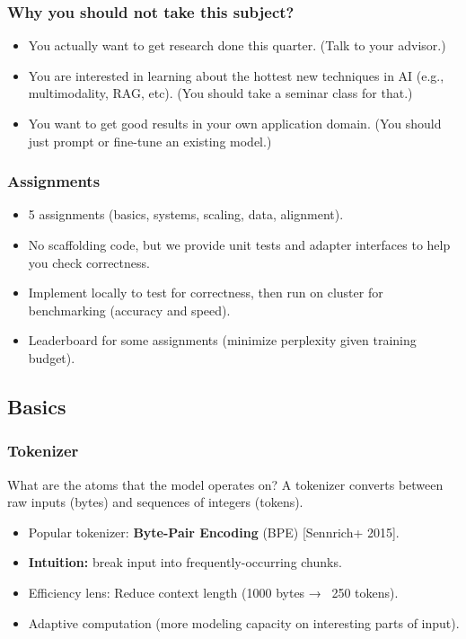 \documentclass[12pt,twoside]{article}
\begin{document}
\subsubsection*{Why you should not take this subject?}

\begin{itemize}
    \item You actually want to get research done this quarter. (Talk to your advisor.)
    \item You are interested in learning about the hottest new techniques in AI (e.g., multimodality, RAG, etc). (You should take a seminar class for that.)
    \item You want to get good results in your own application domain. (You should just prompt or fine-tune an existing model.)
\end{itemize}

\subsubsection*{Assignments}

\begin{itemize}
    \item 5 assignments (basics, systems, scaling, data, alignment).
    \item No scaffolding code, but we provide unit tests and adapter interfaces to help you check correctness.
    \item Implement locally to test for correctness, then run on cluster for benchmarking (accuracy and speed).
    \item Leaderboard for some assignments (minimize perplexity given training budget).
\end{itemize}

\subsection*{Basics}

\subsubsection*{Tokenizer}

What are the atoms that the model operates on? A tokenizer converts between raw inputs (bytes) and sequences of integers (tokens).

\begin{itemize}
    \item Popular tokenizer: \textbf{Byte-Pair Encoding} (BPE) [Sennrich+ 2015].
    \item \textbf{Intuition:} break input into frequently-occurring chunks.
    \item Efficiency lens: Reduce context length (1000 bytes → ~250 tokens).
    \item Adaptive computation (more modeling capacity on interesting parts of input).
\end{itemize}
\end{document}
